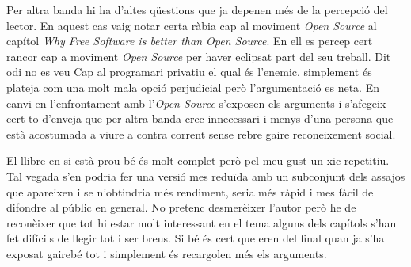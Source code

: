 \documentclass[a4paper,10pt]{scrartcl}
\begin{document}
Per altra banda hi ha d'altes qüestions que ja depenen més de la percepció del lector. En aquest cas
vaig notar certa ràbia cap al moviment \emph{Open Source} al capítol \emph{Why Free Software is better than Open Source}.
En ell es percep cert rancor cap a moviment \emph{Open Source} per haver eclipsat part del seu treball. Dit odi no es veu
Cap al programari privatiu el qual és l'enemic, simplement és plateja com una molt mala opció perjudicial però
l'argumentació es neta. En canvi en l'enfrontament amb l'\emph{Open Source} s'exposen els arguments i s'afegeix cert
to d'enveja que per altra banda crec innecessari i menys d'una persona que està acostumada a viure a contra corrent
sense rebre gaire reconeixement social.

El llibre en si està prou bé és molt complet però pel meu gust un xic repetitiu. Tal vegada s'en podria
fer una versió mes reduïda amb un subconjunt dels assajos que apareixen i se n'obtindria més rendiment,
seria més ràpid i mes fàcil de difondre al públic en general. No pretenc desmerèixer l'autor
però he de reconèixer que tot hi estar molt interessant en el tema alguns dels capítols
s'han fet difícils de llegir tot i ser breus. Si bé és cert que eren del final quan ja s'ha exposat
gairebé tot i simplement és recargolen més els arguments.

  
\end{document}
